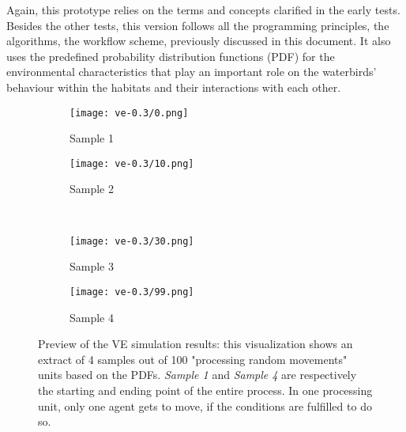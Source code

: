 Again, this prototype relies on the terms and concepts clarified in the early tests. Besides the other tests, this version follows all the programming principles, the algorithms, the workflow scheme, previously discussed in this document. It also uses the predefined probability distribution functions (PDF) for the environmental characteristics that play an important role on the waterbirds' behaviour within the habitats and their interactions with each other.

\begin{figure}[h!]
    \centering
    \begin{subfigure}[b]{0.4\linewidth}
      \texttt{[image: ve-0.3/0.png]}
      \caption{Sample 1}
    \end{subfigure}
    \begin{subfigure}[b]{0.4\linewidth}
      \texttt{[image: ve-0.3/10.png]}
      \caption{Sample 2}
    \end{subfigure} \\ [2ex]
    \begin{subfigure}[b]{0.4\linewidth}
      \texttt{[image: ve-0.3/30.png]}
      \caption{Sample 3}
    \end{subfigure}
    \begin{subfigure}[b]{0.4\linewidth}
      \texttt{[image: ve-0.3/99.png]}
      \caption{Sample 4}
    \end{subfigure}
    \caption{Preview of the VE simulation results: this visualization shows an extract of 4 samples out of 100 "processing random movements" units based on the PDFs. \emph{Sample 1} and \emph{Sample 4} are respectively the starting and ending point of the entire process. In one processing unit, only one agent gets to move, if the conditions are fulfilled to do so. }
    \label{fig:ve-prototype}
\end{figure}

